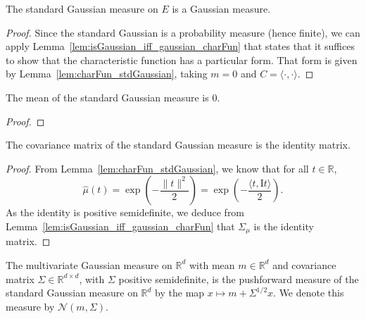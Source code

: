 \begin{lemma}\label{lem:isGaussian_stdGaussian}
  \leanok
The standard Gaussian measure on $E$ is a Gaussian measure.
\end{lemma}

\begin{proof}\leanok
Since the standard Gaussian is a probability measure (hence finite), we can apply Lemma~\ref{lem:isGaussian_iff_gaussian_charFun} that states that it suffices to show that the characteristic function has a particular form.
That form is given by Lemma~\ref{lem:charFun_stdGaussian}, taking $m=0$ and $C = \langle\cdot, \cdot\rangle$.
\end{proof}


\begin{lemma}\label{lem:integral_id_stdGaussian}
  \leanok
The mean of the standard Gaussian measure is $0$.
\end{lemma}

\begin{proof}\leanok

\end{proof}


\begin{lemma}\label{lem:covMatrix_stdGaussian}
  \leanok
The covariance matrix of the standard Gaussian measure is the identity matrix.
\end{lemma}

\begin{proof}\leanok
From Lemma~\ref{lem:charFun_stdGaussian}, we know that for all $t \in \mathbb{R}$,
$$\hat{\mu}(t) = \exp\left(-\frac{\|t\|^2}{2}\right) = \exp\left(-\frac{\langle t, \mathrm{I}t\rangle}{2}\right).$$
As the identity is positive semidefinite, we deduce from Lemma~\ref{lem:isGaussian_iff_gaussian_charFun} that $\Sigma_\mu$ is the identity matrix.
\end{proof}


\begin{definition}\label{def:multivariateGaussian}
  \leanok
The multivariate Gaussian measure on $\mathbb{R}^d$ with mean $m \in \mathbb{R}^d$ and covariance matrix $\Sigma \in \mathbb{R}^{d \times d}$, with $\Sigma$ positive semidefinite, is the pushforward measure of the standard Gaussian measure on $\mathbb{R}^d$ by the map $x \mapsto m + \Sigma^{1/2} x$.
We denote this measure by $\mathcal{N}(m, \Sigma)$.
\end{definition}


